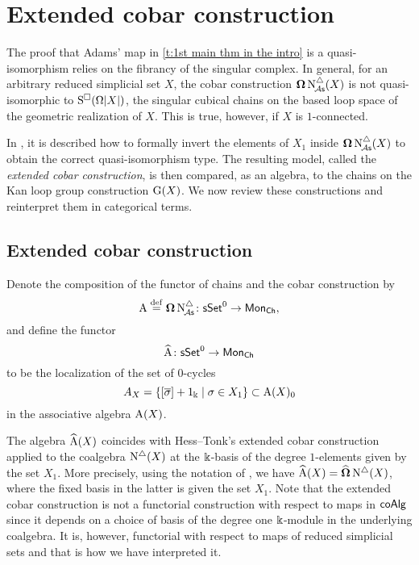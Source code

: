 
\section{Extended cobar construction}\label{s:extended}

The proof that Adams' map in \cref{t:1st main thm in the intro} is a quasi-isomorphism relies on the fibrancy of the singular complex.
In general, for an arbitrary reduced simplicial set $X$, the cobar construction $\operatorname{\mathbf{\Omega}}\operatorname{N^{\triangle}_{\!{\mathcal{A}\mathsf{s}}}}(X)$ is not quasi-isomorphic to $\operatorname{S^{\square}}(\Omega|X|)$, the singular cubical chains on the based loop space of the geometric realization of $X$.
This is true, however, if $X$ is $1$-connected.

In \cite{hess2010cobar}, it is described how to formally invert the elements of $X_1$ inside $\operatorname{\mathbf{\Omega}} \operatorname{N^{\triangle}_{\!{\mathcal{A}\mathsf{s}}}}(X)$ to obtain the correct quasi-isomorphism type.
The resulting model, called the \textit{extended cobar construction}, is then compared, as an algebra, to the chains on the Kan loop group construction $\operatorname{G}(X)$.
We now review these constructions and
reinterpret them in categorical terms.

\subsection{Extended cobar construction}

Denote the composition of the functor of chains and the cobar construction by
\[
\operatorname{A} \stackrel{\mathrm{def}}{=} \operatorname{\mathbf{\Omega}} \operatorname{N^{\triangle}_{\!{\mathcal{A}\mathsf{s}}}} \colon \mathsf{sSet}^0 \to \mathsf{Mon}_{\mathsf{Ch}},
\]
and define the functor
\[
\operatorname{\widehat{A}} \colon \mathsf{sSet}^0 \to \mathsf{Mon}_{\mathsf{Ch}}
\]
to be the localization of the set of $0$-cycles
\[
A_X = \{ [\overline{\sigma}]+1_\Bbbk \mid \sigma \in X_1 \} \subset \operatorname{A}(X)_0
\]
in the associative algebra $\operatorname{A}(X)$.

The algebra $\operatorname{\widehat{A}}(X)$ coincides with Hess--Tonk's extended cobar construction applied to the coalgebra $\operatorname{N^{\triangle}}(X)$ at the $\Bbbk$-basis of the degree $1$-elements given by the set $X_1$.
More precisely, using the notation of \cite{hess2010cobar}, we have $\operatorname{\widehat{A}}(X) = \widehat{\operatorname{\mathbf{\Omega}}} \operatorname{N^{\triangle}}(X)$, where the fixed basis in the latter is given the set $X_1$.
Note that the extended cobar construction is not a functorial construction with respect to maps in $\mathsf{coAlg}$ since it depends on a choice of basis of the degree one $\Bbbk$-module in the underlying coalgebra.
It is, however, functorial with respect to maps of reduced simplicial sets and that is how we have interpreted it.

